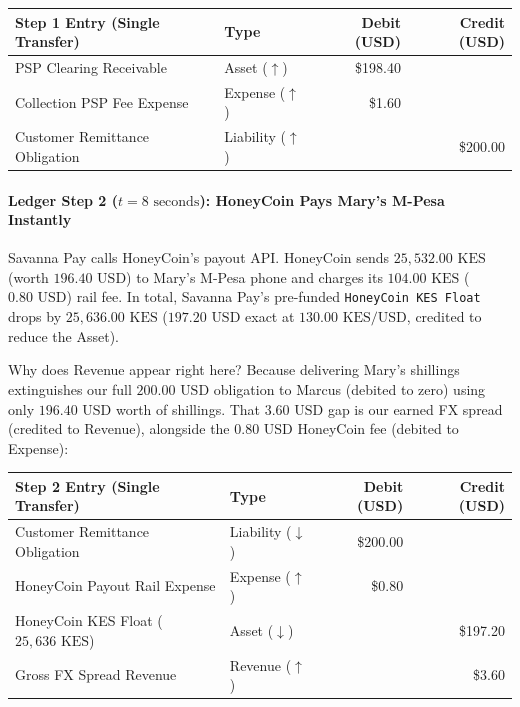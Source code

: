 \begin{center}
\small
\begin{tabular}{llrr}
\toprule
\textbf{Step 1 Entry (Single Transfer)} & \textbf{Type} & \textbf{Debit (USD)} & \textbf{Credit (USD)} \\
\midrule
PSP Clearing Receivable & Asset ($\uparrow$) & \$198.40 & \\
Collection PSP Fee Expense & Expense ($\uparrow$) & \$1.60 & \\
Customer Remittance Obligation & Liability ($\uparrow$) & & \$200.00 \\
\bottomrule
\end{tabular}
\end{center}

\paragraph{Ledger Step 2 ($t = 8\text{ seconds}$): HoneyCoin Pays Mary's M-Pesa Instantly}
Savanna Pay calls HoneyCoin's payout API. HoneyCoin sends $25{,}532.00\text{ KES}$ (worth $196.40\text{ USD}$) to Mary's M-Pesa phone and charges its $104.00\text{ KES}$ ($0.80\text{ USD}$) rail fee. In total, Savanna Pay's pre-funded \texttt{HoneyCoin KES Float} drops by $25{,}636.00\text{ KES}$ ($197.20\text{ USD}$ exact at $130.00\text{ KES/USD}$, credited to reduce the Asset).

Why does Revenue appear right here? Because delivering Mary's shillings extinguishes our full $200.00\text{ USD}$ obligation to Marcus (debited to zero) using only $196.40\text{ USD}$ worth of shillings. That $3.60\text{ USD}$ gap is our earned FX spread (credited to Revenue), alongside the $0.80\text{ USD}$ HoneyCoin fee (debited to Expense):

\begin{center}
\small
\begin{tabular}{llrr}
\toprule
\textbf{Step 2 Entry (Single Transfer)} & \textbf{Type} & \textbf{Debit (USD)} & \textbf{Credit (USD)} \\
\midrule
Customer Remittance Obligation & Liability ($\downarrow$) & \$200.00 & \\
HoneyCoin Payout Rail Expense & Expense ($\uparrow$) & \$0.80 & \\
HoneyCoin KES Float ($25{,}636\text{ KES}$) & Asset ($\downarrow$) & & \$197.20 \\
Gross FX Spread Revenue & Revenue ($\uparrow$) & & \$3.60 \\
\bottomrule
\end{tabular}
\end{center}


